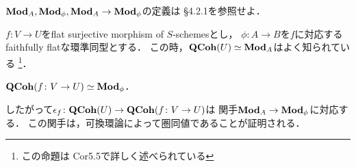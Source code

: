 \documentclass[a4paper, dvipdfmx]{jsarticle}
\begin{document}
    $\mathbf{Mod}_A, \mathbf{Mod}_{\phi}, \mathbf{Mod}_A \to \mathbf{Mod}_{\phi}$の定義は
    \cite{NoteGroTop} \S4.2.1を参照せよ．

    $f \colon V \to U$をflat surjective morphism of $S$-schemesとし，
    $\phi \colon A \to B$を$f$に対応するfaithfully flatな環準同型とする．
    この時，$\mathbf{QCoh}(U) \simeq \mathbf{Mod}_A$はよく知られている
    \footnote{この命題は\cite{HarAG} Cor5.5で詳しく述べられている}．
    \begin{Claim}
        $\mathbf{QCoh}(f \colon V \to U) \simeq \mathbf{Mod}_{\phi}$．
    \end{Claim}
    したがって$\epsilon_{f} \colon \mathbf{QCoh}(U) \to \mathbf{QCoh}(f \colon V \to U)$は
    関手$\mathbf{Mod}_A \to \mathbf{Mod}_{\phi}$に対応する．
    この関手は，可換環論によって圏同値であることが証明される．



\end{document}
